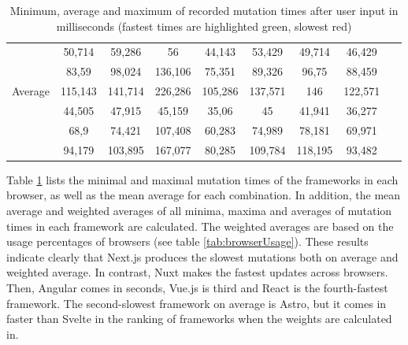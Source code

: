 \documentclass[a4paper, 12pt]{article}
\begin{document}
\begin{table}[!ht]
\begin{adjustbox}{angle=90}
{\begin{tabular}{|l|c|c|c|c|c|c|c|r|}
                 \hline
                                                     & 50,714  & 59,286                    & 56                        & 44,143                  & 53,429  & 49,714  & 46,429  & ~       \\
                                                     & 83,59   & 98,024                    & 136,106                   & 75,351                  & 89,326  & 96,75   & 88,459  & ~       \\
                 \multirow{-3}{*}{Average}           & 115,143 & 141,714                   & 226,286                   & 105,286                 & 137,571 & 146     & 122,571 & ~       \\ \hline
\rowcolor{white}                                     & 44,505  & 47,915                    & 45,159                    & 35,06                   & 45      & 41,941  & 36,277  & ~       \\
\rowcolor{white}                                     & 68,9    & 74,421                    & 107,408                   & 60,283                  & 74,989  & 78,181  & 69,971  & ~       \\
\rowcolor{white} \multirow{-3}{*}{Weighted average}  & 94,179  & 103,895                   & 167,077                   & 80,285                  & 109,784 & 118,195 & 93,482  & ~       \\ \hline
      \end{tabular}
    }
  \end{adjustbox}
  \caption{Minimum, average and maximum of recorded mutation times after user input in milliseconds (fastest times are highlighted green, slowest red)}
  \label{tab:mutations:times}
\end{table}

Table \ref{tab:mutations:times} lists the minimal and maximal mutation times of the frameworks in each browser, as well as the mean average for each combination.
In addition, the mean average and weighted averages of all minima, maxima and averages of mutation times in each framework are calculated.
The weighted averages are based on the usage percentages of browsers (see table \ref{tab:browserUsage}).
These results indicate clearly that Next.js produces the slowest mutations both on average and weighted average.
In contrast, Nuxt makes the fastest updates across browsers.
Then, Angular comes in seconds, Vue.js is third and React is the fourth-fastest framework.
The second-slowest framework on average is Astro, but it comes in faster than Svelte in the ranking of frameworks when the weights are calculated in.
\end{document}
